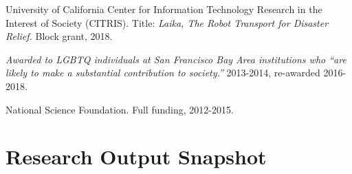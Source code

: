 \documentclass[letterpaper]{deedy-resume} %
\newcommand\Tstrut{\rule{0pt}{2.6ex}}         %
\begin{document}
{\begin{etaremune}[itemsep=0.05cm]
\item {{} University of California Center for Information Technology Research in the Interest of Society (CITRIS). Title: {\it Laika, The Robot Transport for Disaster Relief.}  Block grant, 2018.}

\item {{} {\it Awarded to LGBTQ individuals at San Francisco Bay Area institutions who ``are likely to make a substantial contribution to society.''} 2013-2014, re-awarded 2016-2018.}

\item {{} National Science Foundation. Full funding, 2012-2015.}

\end{etaremune}


\section{Research Output Snapshot}
\vspace{-0.3cm}
 

}
\end{document}
